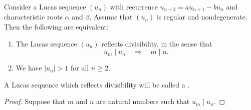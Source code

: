 \begin{theorem}
  Consider a Lucas sequence $(u_n)$ with recurrence $u_{n+2}=au_{n+1}-bu_n$ and characteristic roots $\alpha$ and $\beta$. Assume that $(u_n)$ is regular and nondegenerate. Then the following are equivalent:
  \begin{enumerate}
  \item The Lucas sequence $(u_n)$ reflects divisibility, in the sense that
    \begin{equation*}
      u_m\mid u_n\quad\Rightarrow\quad m\mid n.
    \end{equation*}
  \item We have $|u_n|>1$ for all $n\geq 2$.
  \end{enumerate}
  A Lucas sequence which reflects divisibility will be called a .
\end{theorem}

\begin{proof}
  Suppose that $m$ and $n$ are natural numbers such that $u_m\mid u_n$. 
\end{proof}

